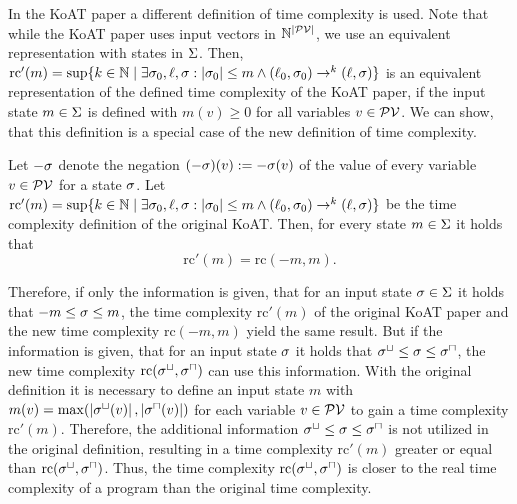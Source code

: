 In the KoAT paper \cite{koat} a different definition of time complexity is used.
Note that while the KoAT paper uses input vectors in $\mathbb{N}^{\left|\mathcal{PV}\right|}$, we use an equivalent representation with states in $\Sigma$.
Then, $\text{rc}'(m) = \sup \lbrace  k \in \mathbb{N} \mid \exists \sigma_0, \ell, \sigma: \left|\sigma_0\right| \leq m \wedge (\ell_0, \sigma_0) \rightarrow^k (\ell, \sigma)  \rbrace$ is an equivalent representation of the defined time complexity of the KoAT paper, if the input state $m \in \Sigma$ is defined with $m(v) \geq 0$ for all variables $v \in \mathcal{PV}$.
We can show, that this definition is a special case of the new definition of time complexity.

\begin{remark}
  Let $-\sigma$ denote the negation $(-\sigma)(v) := -\sigma(v)$ of the value of every variable $v \in \mathcal{PV}$ for a state $\sigma$.
  Let $\text{rc}'(m) = \sup \lbrace  k \in \mathbb{N} \mid \exists \sigma_0, \ell, \sigma: \left|\sigma_0\right| \leq m \wedge (\ell_0, \sigma_0) \rightarrow^k (\ell, \sigma)  \rbrace$ be the time complexity definition of the original KoAT.
  Then, for every state $m \in \Sigma$ it holds that
  \[ \text{rc}'(m) = \text{rc}(-m,m). \]
\end{remark}

Therefore, if only the information is given, that for an input state $\sigma \in \Sigma$ it holds that $-m \leq \sigma \leq m$, the time complexity $\text{rc}'(m)$ of the original KoAT paper and the new time complexity $\text{rc}(-m,m)$ yield the same result.
But if the information is given, that for an input state $\sigma$ it holds that ${\sigma^\sqcup} \leq \sigma \leq {\sigma^\sqcap}$, the new time complexity $\text{rc}({\sigma^\sqcup}, {\sigma^\sqcap})$ can use this information.
With the original definition it is necessary to define an input state $m$ with $m(v) = \max(\left|{\sigma^\sqcup}(v)\right|, \left|{\sigma^\sqcap}(v)\right|)$ for each variable $v \in \mathcal{PV}$ to gain a time complexity $\text{rc}'(m)$.
Therefore, the additional information ${\sigma^\sqcup} \leq \sigma \leq {\sigma^\sqcap}$ is not utilized in the original definition, resulting in a time complexity $\text{rc}'(m)$ greater or equal than $\text{rc}({\sigma^\sqcup}, {\sigma^\sqcap})$.
Thus, the time complexity $\text{rc}({\sigma^\sqcup}, {\sigma^\sqcap})$ is closer to the real time complexity of a program than the original time complexity.

